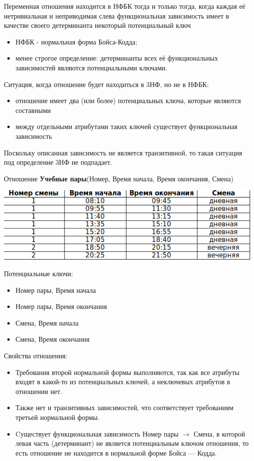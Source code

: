 \documentclass{beamer}
\begin{document}
\begin{frame}
\begin{block}{Переменная отношения находится в НФБК}
тогда и только тогда, когда каждая её нетривиальная и неприводимая слева функциональная зависимость имеет в качестве своего детерминанта некоторый потенциальный ключ
\begin{itemize}
\item НФБК - нормальная форма Бойса-Кодда;
\item менее строгое определение: детерминанты всех её функциональных зависимостей являются потенциальными ключами.
\end{itemize}
\end{block}
Ситуация, когда отношение будет находиться в 3НФ, но не в НФБК:
\begin{itemize}
\item отношение имеет два (или более) потенциальных ключа, которые являются составными
\item между отдельными атрибутами таких ключей существует функциональная зависимость
\end{itemize}
Поскольку описанная зависимость не является транзитивной, то такая ситуация под определение 3НФ не подпадает. 
\end{frame}

\begin{frame}
Отношение \textbf{Учебные пары}(Номер, Время начала, Время окончания, Смена)
\begin{center}
\includegraphics[scale=1]{images/ex-rasp-08.png}
\end{center}
Потенциальные ключи:
\begin{itemize}
\item Номер пары, Время начала
\item Номер пары, Время окончания
\item Смена, Время начала
\item Смена, Время окончания
\end{itemize}
Свойства отношения:
\begin{itemize}
\item Требования второй нормальной формы выполняются, так как все атрибуты входят в какой-то из потенциальных ключей, а неключевых атрибутов в отношении нет.
\item Также нет и транзитивных зависимостей, что соответствует требованиям третьей нормальной формы.
\item Cуществует функциональная зависимость Номер пары $\rightarrow$ Смена, в которой левая часть (детерминант) не является потенциальным ключом отношения, то есть отношение не находится в нормальной форме Бойса — Кодда.
\end{itemize}
\end{frame}
\end{document}
